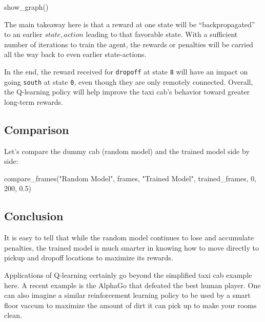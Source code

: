\documentclass[
  letterpaper,
]{scrbook}
\newenvironment{Shaded}{\begin{snugshade}}{\end{snugshade}}
\newcommand{\DecValTok}[1]{\textcolor[rgb]{0.68,0.00,0.00}{#1}}
\newcommand{\FloatTok}[1]{\textcolor[rgb]{0.68,0.00,0.00}{#1}}
\newcommand{\NormalTok}[1]{\textcolor[rgb]{0.00,0.23,0.31}{#1}}
\newcommand{\StringTok}[1]{\textcolor[rgb]{0.13,0.47,0.30}{#1}}
\begin{document}
\begin{Shaded}
\begin{Highlighting}[]
\NormalTok{show\_graph()}
\end{Highlighting}
\end{Shaded}

The main takeaway here is that a reward at one state will be
``backpropagated'' to an earlier \(state, action\) leading to that
favorable state. With a sufficient number of iterations to train the
agent, the rewards or penalties will be carried all the way back to even
earlier state-actions.

In the end, the reward received for \texttt{dropoff} at state \texttt{8}
will have an impact on going \texttt{south} at state \texttt{0}, even
though they are only remotely connected. Overall, the Q-learning policy
will help improve the taxi cab's behavior toward greater long-term
rewards.

\subsection*{Comparison}\label{comparison}

Let's compare the dummy cab (random model) and the trained model side by
side:

\begin{Shaded}
\begin{Highlighting}[]
\NormalTok{compare\_frames(}\StringTok{"Random Model"}\NormalTok{, frames, }\StringTok{"Trained Model"}\NormalTok{, trained\_frames, }\DecValTok{0}\NormalTok{, }\DecValTok{200}\NormalTok{, }\FloatTok{0.5}\NormalTok{)}
\end{Highlighting}
\end{Shaded}

\subsection*{Conclusion}\label{conclusion}

It is easy to tell that while the random model continues to lose and
accumulate penalties, the trained model is much smarter in knowing how
to move directly to pickup and dropoff locations to maximize its
rewards.

Applications of Q-learning certainly go beyond the simplified taxi cab
example here. A recent example is the AlphaGo that defeated the best
human player. One can also imagine a similar reinforcement learning
policy to be used by a smart floor vaccum to maximize the amount of dirt
it can pick up to make your rooms clean.
\end{document}
